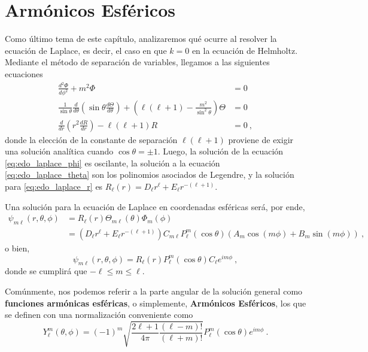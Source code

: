 \section{Armónicos Esféricos}

Como último tema de este capítulo, analizaremos qué ocurre al resolver la ecuación de Laplace, es decir, el caso en que $k=0$ en la ecuación de Helmholtz. Mediante el método de separación de variables, llegamos a las siguientes ecuaciones
\begin{align}
    \frac{d^2 \Phi}{d\phi^2} + m^2 \Phi & = 0 \label{eq:edo_laplace_phi} \\
    \frac{1}{\sin \theta} \frac{d}{d\theta}\left( \sin\theta \frac{d\Theta}{d\theta} \right) + \left( \ell(\ell+1) - \frac{m^2}{\sin^2\theta} \right)\Theta & = 0 \label{eq:edo_laplace_theta} \\
    \frac{d}{dr}\left( r^2 \frac{dR}{dr} \right) - \ell(\ell+1) R & = 0 \ , \label{eq:edo_laplace_r}
\end{align}
donde la elección de la constante de separación $\ell(\ell+1)$ proviene de exigir una solución analítica cuando $\cos\theta = \pm 1$. Luego, la solución de la ecuación \eqref{eq:edo_laplace_phi} es oscilante, la solución a la ecuación \eqref{eq:edo_laplace_theta} son los polinomios asociados de Legendre, y la solución para \eqref{eq:edo_laplace_r} es $R_\ell(r) = D_\ell r^\ell + E_\ell r^{-(\ell+1)}$.

Una solución para la ecuación de Laplace en coordenadas esféricas será, por ende,
\begin{align}
    \psi_{m\ell}(r,\theta,\phi) & = R_\ell(r) \Theta_{m\ell}(\theta) \Phi_m (\phi) \nonumber \\
    & = (D_\ell r^\ell + E_\ell r^{-(\ell+1)}) C_{m\ell} P_\ell^m(\cos\theta)(A_m \cos(m\phi) + B_m \sin(m\phi)) \ ,
\end{align}
o bien,
\begin{equation}
    \psi_{m\ell}(r,\theta,\phi) = R_\ell(r) P_\ell^m(\cos\theta) C_\ell e^{im\phi} \ ,
\end{equation}
donde se cumplirá que $- \ell \leq m \leq \ell$.

Comúnmente, nos podemos referir a la parte angular de la solución general como \textbf{funciones armónicas esféricas}, o simplemente, \textbf{Armónicos Esféricos}, los que se definen con una normalización conveniente como
\begin{equation}
    Y_\ell^m(\theta, \phi) = (-1)^m \sqrt{\frac{2\ell + 1}{4\pi} \frac{(\ell-m)!}{(\ell+m)!} } P_\ell^m (\cos\theta) e^{im\phi} \ .
\end{equation}

